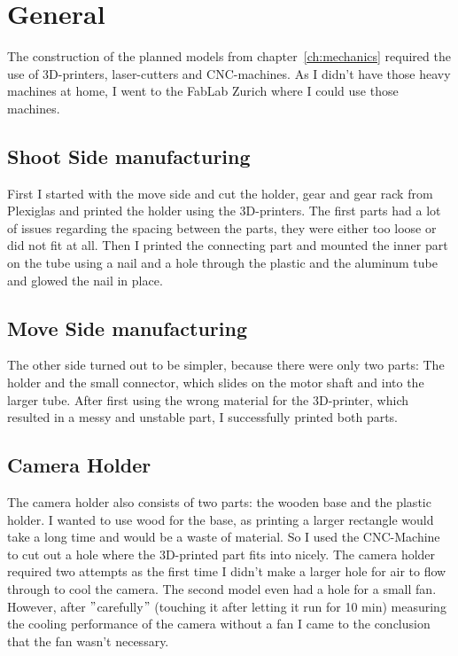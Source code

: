 \section{General}\label{sec:general3}
The construction of the planned models from chapter~\ref{ch:mechanics} required the use of 3D-printers, laser-cutters and CNC-machines.
As I didn't have those heavy machines at home, I went to the FabLab Zurich\autocite{fablab} where I could use those machines.

\subsection{Shoot Side manufacturing}\label{subsec:turn-side-manufacturing}
First I started with the move side and cut the holder, gear and gear rack from Plexiglas and printed the holder using the 3D-printers.
The first parts had a lot of issues regarding the spacing between the parts, they were either too loose or did not fit at all.
Then I printed the connecting part and mounted the inner part on the tube using a nail and a hole through the plastic and the aluminum tube and glowed the nail in place.

\subsection{Move Side manufacturing}\label{subsec:move-side-manufacturing}
The other side turned out to be simpler, because there were only two parts: The holder and the small connector, which slides on the motor shaft and into the larger tube.
After first using the wrong material for the 3D-printer, which resulted in a messy and unstable part, I successfully printed both parts.

\subsection{Camera Holder}\label{subsec:camera-holder}
The camera holder also consists of two parts: the wooden base and the plastic holder.
I wanted to use wood for the base, as printing a larger rectangle would take a long time and would be a waste of material.
So I used the CNC-Machine to cut out a hole where the 3D-printed part fits into nicely.
The camera holder required two attempts as the first time I didn't make a larger hole for air to flow through to cool the camera.
The second model even had a hole for a small fan.
However, after \("\)carefully\("\) (touching it after letting it run for 10 min) measuring the cooling performance of the camera without a fan I came to the conclusion that the fan wasn't necessary.
